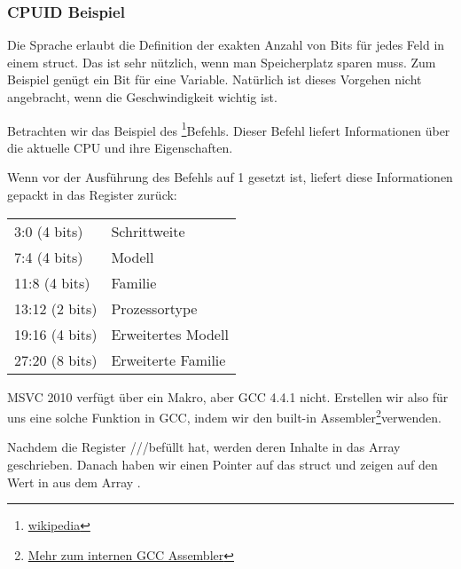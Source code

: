 \subsubsection{CPUID Beispiel}
Die Sprache \CCpp erlaubt die Definition der exakten Anzahl von Bits für jedes Feld in einem struct.
Das ist sehr nützlich, wenn man Speicherplatz sparen muss.
Zum Beispiel genügt ein Bit für eine \Tbool Variable.
Natürlich ist dieses Vorgehen nicht angebracht, wenn die Geschwindigkeit wichtig ist.


\newcommand{\FNCPUID}{\footnote{\href{http://en.wikipedia.org/wiki/CPUID}{wikipedia}}}

\label{cpuid}
Betrachten wir das Beispiel des \CPUID\FNCPUID Befehls.
Dieser Befehl liefert Informationen über die aktuelle CPU und ihre Eigenschaften.

Wenn \EAX vor der Ausführung des Befehls auf 1 gesetzt ist, liefert \CPUID diese Informationen gepackt in das \EAX
Register zurück:

\begin{center}
\begin{tabular}{ | l | l | }
\hline
3:0 (4 bits)& Schrittweite \\
7:4 (4 bits) & Modell \\
11:8 (4 bits) & Familie \\
13:12 (2 bits) & Prozessortype \\
19:16 (4 bits) & Erweitertes Modell \\
27:20 (8 bits) & Erweiterte Familie \\
\hline
\end{tabular}
\end{center}

\newcommand{\FNGCCAS}{\footnote{\href{http://www.ibiblio.org/gferg/ldp/GCC-Inline-Assembly-HOWTO.html}
{Mehr zum internen GCC Assembler}}}
MSVC 2010 verfügt über ein \CPUID Makro, aber GCC 4.4.1 nicht.
Erstellen wir also für uns eine solche Funktion in GCC, indem wir den built-in Assembler\FNGCCAS verwenden.


Nachdem \CPUID die Register \EAX/\EBX/\ECX/\EDX befüllt hat, werden deren Inhalte in das Array  geschrieben.
Danach haben wir einen Pointer auf das  struct und zeigen auf den Wert in \EAX aus dem Array .

